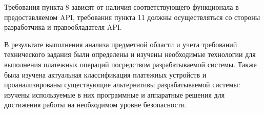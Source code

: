 Требования пункта 8 зависят от наличия соответствующего функционала в предоставляемом API, требования пункта 11 должны осуществляться со стороны разработчика и правообладателя API.


В результате выполнения анализа предметной области и учета требований технического задания были определены и изучены необходимые технологии для выполнения платежных операций посредством разрабатываемой системы.
Также была изучена актуальная классификация платежных устройств и проанализированы существующие альтернативы разрабатываемой системы: изучены используемые в них программные и аппаратные решения для достижения работы на необходимом уровне безопасности.


